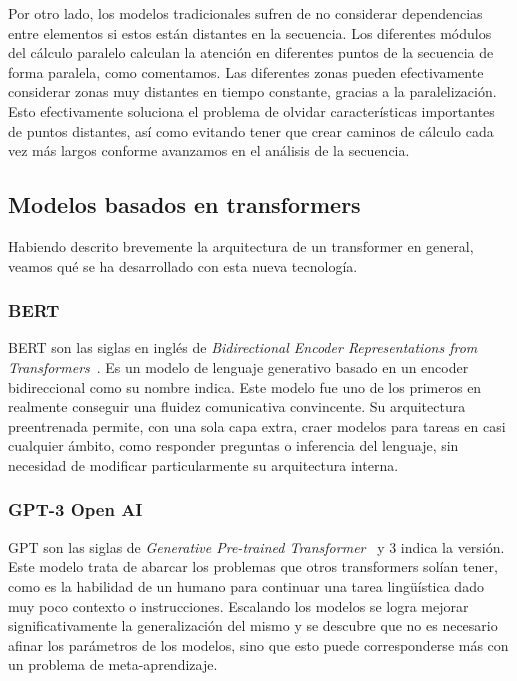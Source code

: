 Por otro lado, los modelos tradicionales sufren de no considerar dependencias entre elementos si estos están distantes en la secuencia. Los diferentes módulos del cálculo paralelo calculan la atención en diferentes puntos de la secuencia de forma paralela, como comentamos. Las diferentes zonas pueden efectivamente considerar zonas muy distantes en tiempo constante, gracias a la paralelización. Esto efectivamente soluciona el problema de olvidar características importantes de puntos distantes, así como evitando tener que crear caminos de cálculo cada vez más largos conforme avanzamos en el análisis de la secuencia.


\subsection{Modelos basados en transformers}
Habiendo descrito brevemente la arquitectura de un transformer en general, veamos qué se ha desarrollado con esta nueva tecnología.

\subsubsection{BERT}
BERT son las siglas en inglés de \textit{Bidirectional Encoder Representations from Transformers}~\cite{bertDevlin2019}. Es un modelo de lenguaje generativo basado en un encoder bidireccional como su nombre indica. Este modelo fue uno de los primeros en realmente conseguir una fluidez comunicativa convincente. Su arquitectura preentrenada permite, con una sola capa extra, craer modelos para tareas en casi cualquier ámbito, como responder preguntas o inferencia del lenguaje, sin necesidad de modificar particularmente su arquitectura interna.



\subsubsection{GPT-3 Open AI}
GPT son las siglas de \textit{Generative Pre-trained Transformer}~\cite{GPT3openAI2020} y 3 indica la versión. Este modelo trata de abarcar los problemas que otros transformers solían tener, como es la habilidad de un humano para continuar una tarea lingüística dado muy poco contexto o instrucciones. Escalando los modelos se logra mejorar significativamente la generalización del mismo y se descubre que no es necesario afinar los parámetros de los modelos, sino que esto puede corresponderse más con un problema de meta-aprendizaje.



